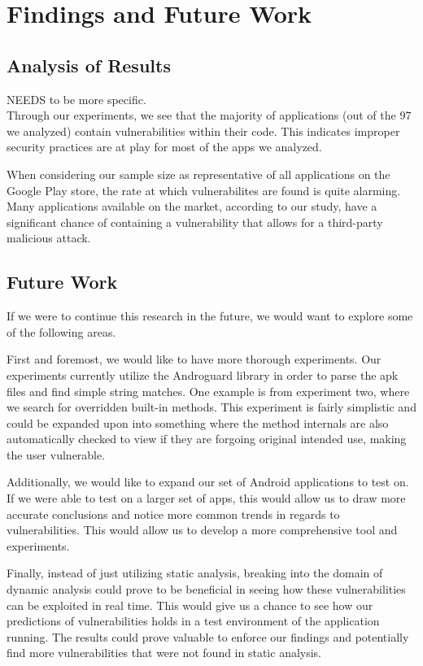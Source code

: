 \section{Findings and Future Work}
\label{sec:relwork}

\subsection{Analysis of Results}

NEEDS to be more specific.\\

Through our experiments, we see that the majority of applications
(out of the 97 we analyzed) contain vulnerabilities within their
code. This indicates improper security practices are at play for 
most of the apps we analyzed.

When considering our sample size as representative of all 
applications on the Google Play store, the rate at which 
vulnerabilites are found is quite alarming. Many applications
available on the market, according to our study, have a significant 
chance of containing a vulnerability that allows for a third-party 
malicious attack.

\subsection{Future Work}
If we were to continue this research in the future, we would 
want to explore some of the following areas. 

First and foremost, we would like to have more thorough experiments. 
Our experiments currently utilize the Androguard library in 
order to parse the apk files and find simple string matches. 
One example is from experiment two, where we search for 
overridden built-in methods. This experiment is fairly simplistic
and could be expanded upon into something where the method 
internals are also automatically checked to view if they are 
forgoing original intended use, making the user vulnerable.

Additionally, we would like to expand our set of Android 
applications to test on. If we were able to test on a larger 
set of apps, this would allow us to draw more accurate 
conclusions and notice more common trends in regards to 
vulnerabilities. This would allow us to develop a more 
comprehensive tool and experiments. 

Finally, instead of just utilizing static analysis, breaking 
into the domain of dynamic analysis could prove to be beneficial 
in seeing how these vulnerabilities can be exploited in real time. 
This would give us a chance to see how our predictions of 
vulnerabilities holds in a test environment of the application 
running. The results could prove valuable to enforce our 
findings and potentially find more vulnerabilities that were 
not found in static analysis. 
